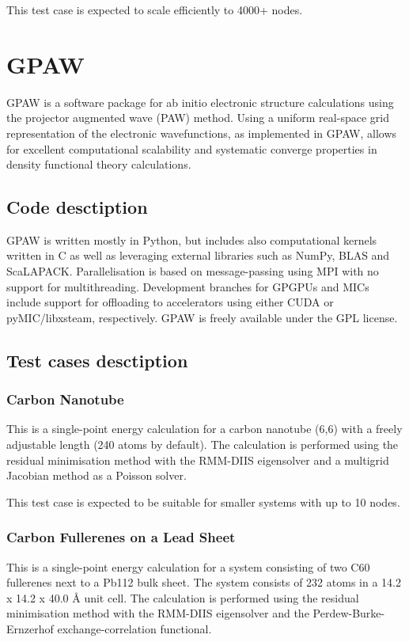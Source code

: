 This test case is expected to scale efficiently to 4000+ nodes.

\section{GPAW}
GPAW is a software package for ab initio electronic structure calculations using the projector augmented wave (PAW) method. Using a uniform real-space grid representation of the electronic wavefunctions, as implemented in GPAW, allows for excellent computational scalability and systematic converge properties in density functional theory calculations.

\subsection{Code desctiption}
GPAW is written mostly in Python, but includes also computational kernels written in C as well as leveraging external libraries such as NumPy, BLAS and ScaLAPACK. Parallelisation is based on message-passing using MPI with no support for multithreading. Development branches for GPGPUs and MICs include support for offloading to accelerators using either CUDA or pyMIC/libxsteam, respectively. GPAW is freely available under the GPL license.

\subsection{Test cases desctiption}
\subsubsection{Carbon Nanotube}
This is a single-point energy calculation for a carbon nanotube (6,6) with a freely adjustable length (240 atoms by default). The calculation is performed using the residual minimisation method with the RMM-DIIS eigensolver and a multigrid Jacobian method as a Poisson solver.

This test case is expected to be suitable for smaller systems with up to 10 nodes.

\subsubsection{Carbon Fullerenes on a Lead Sheet}
This is a single-point energy calculation for a system consisting of two C60 fullerenes next to a Pb112 bulk sheet. The system consists of 232 atoms in a 14.2 x 14.2 x 40.0 Å unit cell. The calculation is performed using the residual minimisation method with the RMM-DIIS eigensolver and the Perdew-Burke-Ernzerhof exchange-correlation functional.

